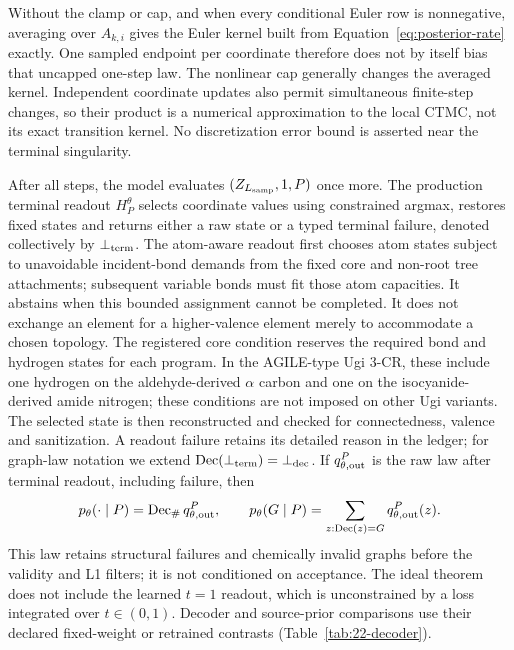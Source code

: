 Without the clamp or cap, and when every conditional Euler row is nonnegative, averaging over
$A_{k,i}$ gives the Euler kernel built from Equation~\ref{eq:posterior-rate} exactly. One sampled
endpoint per coordinate therefore does not by itself bias that uncapped one-step law. The nonlinear
cap generally changes the averaged kernel. Independent coordinate updates also permit simultaneous
finite-step changes, so their product is a numerical approximation to the local CTMC, not its exact
transition kernel. No discretization error bound is asserted near the terminal singularity.

After all steps, the model evaluates $(Z_{L_{\rm samp}},1,P)$ once more. The production terminal
readout $H_P^\theta$ selects coordinate values using constrained argmax, restores fixed states and
returns either a raw state or a typed terminal failure, denoted collectively by $\bot_{\rm term}$.
The atom-aware readout first chooses atom states subject to unavoidable incident-bond demands
from the fixed core and non-root tree attachments; subsequent variable bonds must fit those atom
capacities. It abstains when this bounded assignment cannot be completed. It does not exchange an
element for a higher-valence element merely to accommodate a chosen topology. The registered
core condition reserves the required bond and hydrogen states for each program. In the AGILE-type
Ugi 3-CR, these include one hydrogen on the aldehyde-derived $\alpha$ carbon and one on the
isocyanide-derived amide nitrogen; these conditions are not imposed on other Ugi variants.
The selected state is then reconstructed and checked for
connectedness, valence and sanitization. A readout failure retains its detailed reason in the ledger;
for graph-law notation we extend $\operatorname{Dec}(\bot_{\rm term})=\bot_{\rm dec}$.
If $q_{\theta,\rm out}^P$ is the raw law after terminal readout, including failure, then
\begin{equation}
 p_\theta(\cdot\mid P)=\operatorname{Dec}_{\#}q_{\theta,\rm out}^P,
 \qquad
 p_\theta(G\mid P)=\sum_{z:\operatorname{Dec}(z)=G}q_{\theta,\rm out}^P(z).
 \label{eq:generated-law}
\end{equation}
This law retains structural failures and chemically invalid graphs before the validity and L1
filters; it is not conditioned on acceptance.
The ideal theorem does not include the learned $t=1$ readout, which is unconstrained by a loss
integrated over $t\in(0,1)$. Decoder and source-prior comparisons use their declared fixed-weight
or retrained contrasts (Table~\ref{tab:22-decoder}).

